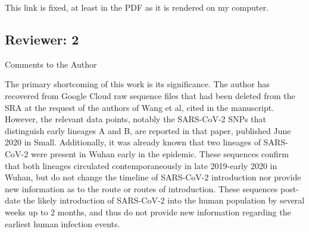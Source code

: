 \documentclass[11pt, oneside]{article}   	%
\newcommand{\response}[1]{{\color{black}#1}}
\begin{document}
\response{This link is fixed, at least in the PDF as it is rendered on my computer.}


\subsection*{Reviewer: 2}

Comments to the Author

The primary shortcoming of this work is its significance. The author has recovered from Google Cloud raw sequence files that had been deleted from the SRA at the request of the authors of Wang et al, cited in the manuscript. However, the relevant data points, notably the SARS-CoV-2 SNPs that distinguish early lineages A and B, are reported in that paper, published June 2020 in Small. Additionally, it was already known that two lineages of SARS-CoV-2 were present in Wuhan early in the epidemic. These sequences confirm that both lineages circulated contemporaneously in late 2019-early 2020 in Wuhan, but do not change the timeline of SARS-CoV-2 introduction nor provide new information as to the route or routes of introduction. These sequences post-date the likely introduction of SARS-CoV-2 into the human population by several weeks up to 2 months, and thus do not provide new information regarding the earliest human infection events.
\end{document}
